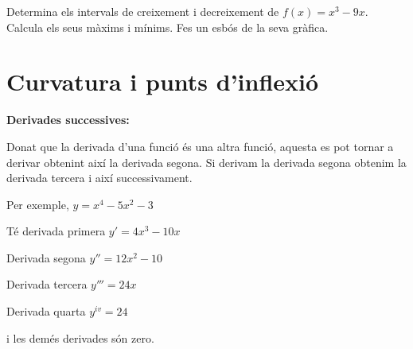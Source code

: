 \begin{mylist}
			\exer Determina els intervals de creixement i decreixement de  $f (x) = x^{3} - 9x$. Calcula els seus màxims i mínims. Fes un esbós de la seva gràfica.
			
			
			
			
		\end{mylist}
	
	
	\section{Curvatura i  punts d'inflexió}
	
	\begin{theorybox}
		\textbf{Derivades successives:}
		
		Donat que la derivada d'una funció és una altra funció, aquesta es pot tornar a derivar obtenint així la derivada segona. Si derivam la derivada segona obtenim la derivada tercera i així successivament.
		
			\begin{minipage}{0.5\textwidth}
		Per exemple, $y=x^4-5x^2-3$
		
		Té derivada primera $y'=4x^3-10x$
		
		Derivada segona $y''=12 x^2 -10$
			\end{minipage}
			\begin{minipage}{0.5\textwidth}
		Derivada tercera $y'''=24 x$
		
		Derivada quarta $y^{iv}=24$
		
		i  les demés derivades són zero.
			\end{minipage}
	\end{theorybox}

